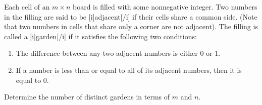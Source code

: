\usepackage{enumitem}

Each cell of an $m\times n$ board is filled with some nonnegative integer.  Two numbers in the filling are said to be [i]adjacent[/i] if their cells share a common side.  (Note that two numbers in cells that share only a corner are not adjacent).  The filling is called a [i]garden[/i] if it satisfies the following two conditions:

\begin{enumerate}[label=(\roman*)]
	\item The difference between any two adjacent numbers is either $0$ or $1$.
	\item If a number is less than or equal to all of its adjacent numbers, then it is equal to $0$.
\end{enumerate}

Determine the number of distinct gardens in terms of $m$ and $n$.